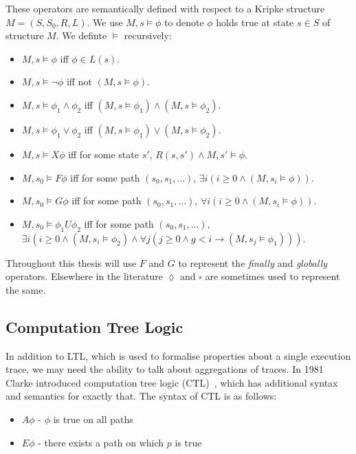 These operators are semantically defined with respect to a Kripke structure $M
= (S, S_0, R, L)$. We use $M, s \models \phi$ to denote $\phi$ holds true at
state $s \in S$ of structure $M$. We definte $\models$ recursively:

\begin{itemize}
    \item $M, s \models \phi$ iff $\phi \in L(s)$.
    \item $M, s \models \lnot\phi$ iff not $(M, s \models \phi)$.
    \item $M, s \models \phi_1 \land \phi_2$ iff $(M, s \models \phi_1) \land (M, s \models \phi_2)$.
    \item $M, s \models \phi_1 \lor \phi_2$ iff $(M, s \models \phi_1) \lor (M, s \models \phi_2)$.
    \item $M, s \models X\phi$ iff for some state $s'$, $R(s, s') \land M, s' \models \phi$.
    \item $M, s_0 \models F\phi$ iff for some path $(s_0, s_1, ...)$, $\exists i (i \geq 0 \land (M, s_i \models \phi))$.
    \item $M, s_0 \models G\phi$ iff for some path $(s_0, s_1, ...)$, $\forall i (i \geq 0 \land (M, s_i \models \phi))$.
    \item $M, s_0 \models \phi_1 U \phi_2$ iff for some path $(s_0, s_1, ...)$, $\exists i (i \geq 0 \land (M, s_i \models \phi_2) \land \forall j (j \geq 0 \land g < i \to (M, s_j \models \phi_1)))$.
\end{itemize}

Throughout this thesis will use $F$ and $G$ to represent the \emph{finally} and
\emph{globally} operators. Elsewhere in the literature $\lozenge$ and $\square$
are sometimes used to represent the same.

\subsection{Computation Tree Logic}

In addition to LTL, which is used to formalise properties about a single
execution trace, we may need the ability to talk about aggregations of traces.
In 1981 Clarke introduced computation tree logic (CTL)~\cite{Clarke81}, which
has additional syntax and semantics for exactly that. The syntax of CTL is as
follows:

\begin{itemize}
    \item $A\phi$ - $\phi$ is true on all paths
    \item $E\phi$ - there exists a path on which $p$ is true
\end{itemize}

